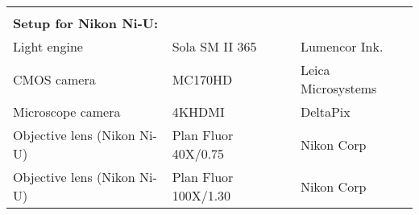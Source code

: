 \begin{table}[H]
{\begin{tabular}{lll}
   && \\
   \multicolumn{3}{l}{\textbf{Setup for Nikon Ni-U:}} \\
   Light engine                             & Sola SM II 365            & Lumencor Ink. \\
   CMOS camera                              & MC170HD                   & Leica Microsystems \\
   Microscope camera                        & 4KHDMI                    & DeltaPix \\
   Objective lens (Nikon Ni-U)              & Plan Fluor 40X/0.75       & Nikon Corp \\
   Objective lens (Nikon Ni-U)              & Plan Fluor 100X/1.30      & Nikon Corp \\
		\bottomrule
	\end{tabular}
	}
\end{table}